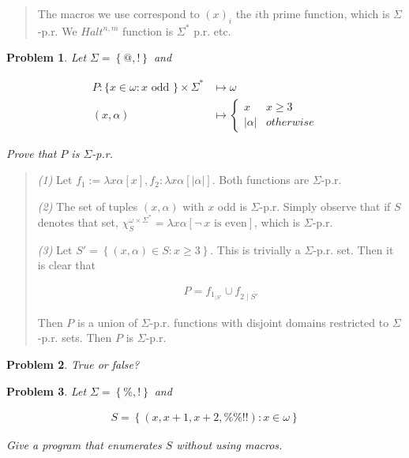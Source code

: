 \documentclass[a4paper, 12pt]{article}
\newtheorem{problem}{Problem}
\newtheorem{problem}{Problem}
\begin{document}
\begin{quote}
The macros we use correspond to $(x)_i$ the $i$th prime function, which is
$\Sigma$-p.r. We $Halt^{n, m}$ function is $\Sigma^{*}$ p.r. etc.


\end{quote}
\normalsize

\begin{problem}
    Let $\Sigma = \left\{ @, ! \right\} $ and 

    \begin{align*}
        P : \{ x \in  \omega: x \text{ odd }\} \times \Sigma^{*} &\mapsto \omega
        \\ 
        (x, \alpha) &\mapsto \begin{cases}
            x & x \geq 3 \\ 
            |\alpha| & otherwise
        \end{cases}
    \end{align*}

    Prove that $P$ is $\Sigma$-p.r. 
\end{problem}


\small
\begin{quote}

\textit{(1)} Let $f_1 := \lambda x\alpha \left[  x \right], f_2 : \lambda
x\alpha \left[ |\alpha|  \right]$. Both functions are $\Sigma$-p.r. 

\textit{(2)} The set of tuples $(x, \alpha)$ with $x$ odd is $\Sigma$-p.r.
Simply observe that if $S$ denotes that set, $\chi_{S}^{\omega \times
\Sigma^{*}} = \lambda x\alpha \left[ \neg ~ x \text{ is even}  \right]$, which
is $\Sigma$-p.r. 

\textit{(3)} Let $S' = \left\{ (x, \alpha) \in S: x \geq 3 \right\} $. This is
trivially a $\Sigma$-p.r. set. Then it is clear that 

\begin{align*}
    P = f_1_{\mid S'} \cup f_{2\mid \overline{S'}}
\end{align*}

Then $P$ is a union of $\Sigma$-p.r. functions with disjoint domains restricted
to $\Sigma$-p.r. sets. Then $P$ is $\Sigma$-p.r. 


\end{quote}
\normalsize

\begin{problem}
    True or false?
\end{problem}

\pagebreak 

\begin{problem}
    Let $\Sigma = \left\{ \%, ! \right\} $ and 

    \begin{align*}
        S = \left\{ (x, x+ 1, x + 2, \%\% !!) : x \in  \omega \right\} 
    \end{align*}

    Give a program that enumerates $S$ without using macros.
\end{problem}
\end{document}
